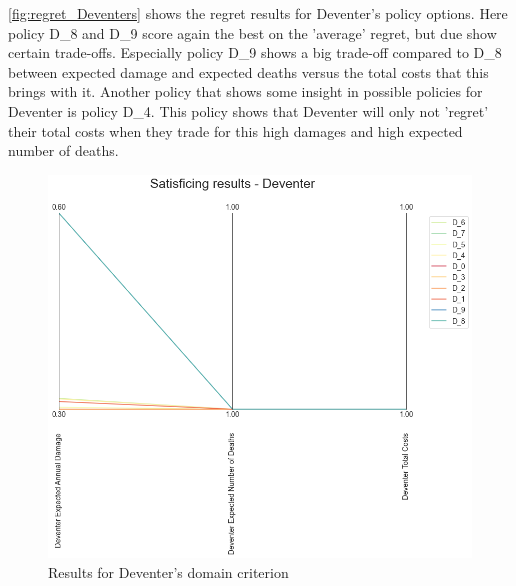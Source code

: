\noindent \autoref{fig:regret_Deventers} shows the regret results for Deventer's policy options. Here policy D\_8 and D\_9 score again the best on the 'average' regret, but due show certain trade-offs. Especially policy D\_9 shows a big trade-off compared to D\_8 between expected damage and expected deaths versus the total costs that this brings with it. Another policy that shows some insight in possible policies for Deventer is policy D\_4. This policy shows that Deventer will only not 'regret' their total costs when they trade for this high damages and high expected number of deaths. 
\begin{figure}[H]
  \centering
  \begin{minipage}[b]{0.4\textwidth}
    \includegraphics[width=1.2\textwidth]{report/figures/results/domain_criterion_Deventer.png}
    \caption{Results for Deventer's domain criterion}
    \label{fig:domain_criterion_Deventers}
  \end{minipage}
  \hfill
  \begin{minipage}[b]{0.4\textwidth}

\end{minipage}
\end{figure}
